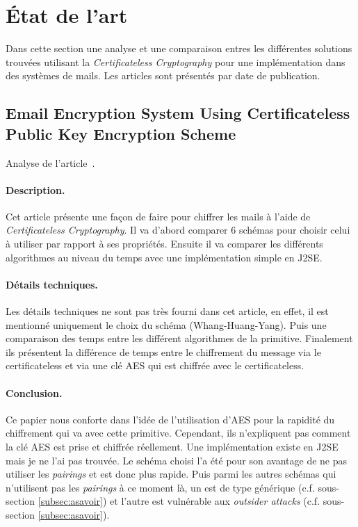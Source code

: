 \section{État de l'art}
Dans cette section une analyse et une comparaison entres les différentes solutions trouvées utilisant la \textit{Certificateless Cryptography} pour une implémentation dans des systèmes de mails. Les articles sont présentés par date de publication. 
\subsection{Email Encryption System Using Certificateless Public Key Encryption Scheme}
Analyse de l'article~\cite{DBLP:conf/itcs2/ErYTG12}.
\paragraph*{Description.} Cet article présente une façon de faire pour chiffrer les mails à l'aide de \textit{Certificateless Cryptography}. Il va d'abord comparer 6 schémas pour choisir celui à utiliser par rapport à ses propriétés. Ensuite il va comparer les différents algorithmes au niveau du temps avec une implémentation simple en J2SE. 
\paragraph*{Détails techniques.} Les détails techniques ne sont pas très fourni dans cet article, en effet, il est mentionné uniquement le choix du schéma (Whang-Huang-Yang). Puis une comparaison des temps entre les différent algorithmes de la primitive. Finalement ils présentent la différence de temps entre le chiffrement du message via le certificateless et via une clé AES qui est chiffrée avec le certificateless.
\paragraph*{Conclusion.} Ce papier nous conforte dans l'idée de l'utilisation d'AES pour la rapidité du chiffrement qui va avec cette primitive. Cependant, ils n'expliquent pas comment la clé AES est prise et chiffrée réellement. Une implémentation existe en J2SE mais je ne l'ai pas trouvée. Le schéma choisi l'a été pour son avantage de ne pas utiliser les \textit{pairings} et est donc plus rapide. Puis parmi les autres schémas qui n'utilisent pas les \textit{pairings} à ce moment là, un est de type générique (c.f. sous-section \ref{subsec:asavoir}) et l'autre est vulnérable aux \textit{outsider attacks} (c.f. sous-section \ref{subsec:asavoir}).
